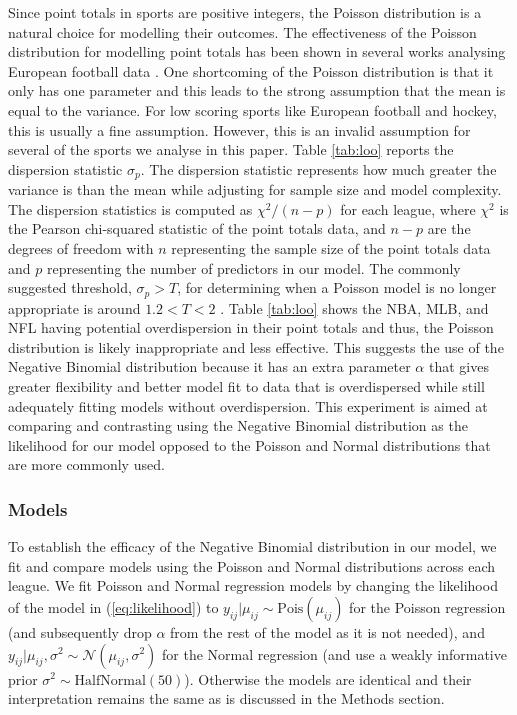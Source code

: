 Since point totals in sports are positive integers, the Poisson distribution is a natural choice for modelling their outcomes. The effectiveness of the Poisson distribution for modelling point totals has been shown in several works analysing European football data \cite{Karlis2003} \cite{Baio2010} \cite{Benz2020}. One shortcoming of the Poisson distribution is that it only has one parameter and this leads to the strong assumption that the mean is equal to the variance. For low scoring sports like European football and hockey, this is usually a fine assumption. However, this is an invalid assumption for several of the sports we analyse in this paper. Table \ref{tab:loo} reports the dispersion statistic \(\sigma_p\). The dispersion statistic represents how much greater the variance is than the mean while adjusting for sample size and model complexity. The dispersion statistics is computed as  \(\chi^2/(n-p)\) for each league, where \(\chi^2\) is the Pearson chi-squared statistic of the point totals data, and \(n-p\) are the degrees of freedom with \(n\) representing the sample size of the point totals data and \(p\) representing the number of predictors in our model. The commonly suggested threshold, \(\sigma_p > T\), for determining when a Poisson model is no longer appropriate is around \(1.2 < T < 2\) \cite{Payne2018} \cite{Cameron1990}. Table \ref{tab:loo} shows the NBA, MLB, and NFL having potential overdispersion in their point totals and thus, the Poisson distribution is likely inappropriate and less effective. This suggests the use of the Negative Binomial distribution because it has an extra parameter \(\alpha\) that gives greater flexibility and better model fit to data that is overdispersed while still adequately fitting models without overdispersion. This experiment is aimed at comparing and contrasting using the Negative Binomial distribution as the likelihood for our model opposed to the Poisson and Normal distributions that are more commonly used.

\subsubsection*{Models}

To establish the efficacy of the Negative Binomial distribution in our model, we fit and compare models using the Poisson and Normal distributions across each league. We fit Poisson and Normal regression models by changing the likelihood of the model in (\ref{eq:likelihood}) to \(y_{ij} | \mu_{ij} \sim \text{Pois}(\mu_{ij})\) for the Poisson regression (and subsequently drop \(\alpha\) from the rest of the model as it is not needed), and \(y_{ij} | \mu_{ij}, \sigma^2 \sim \mathcal{N}(\mu_{ij}, \sigma^2)\) for the Normal regression (and use a weakly informative prior \(\sigma^2 \sim \text{HalfNormal}(50)\)). Otherwise the models are identical and their interpretation remains the same as is discussed in the Methods section.

